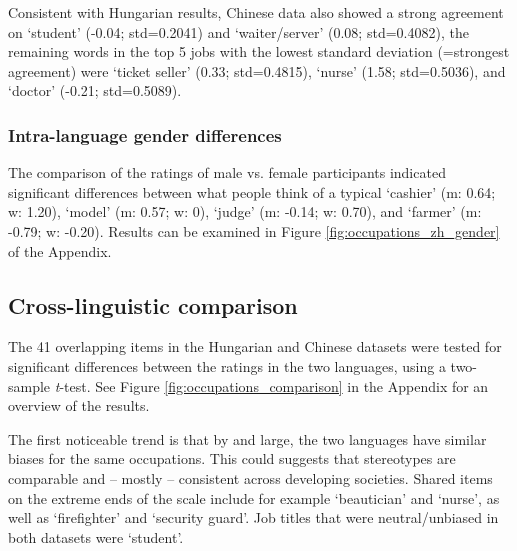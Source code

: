 \documentclass[11pt]{article}
\newcommand{\zh}[1]{\simplifiedchinesefont{#1}\rmfamily}
\begin{document}
Consistent with Hungarian results, Chinese data also showed a strong agreement on \zh{学生} `student' (-0.04; std=0.2041) and \zh{服务员} `waiter/server' (0.08; std=0.4082), the remaining words in the top 5 jobs with the lowest standard deviation (=strongest agreement) were \zh{售票员} `ticket seller' (0.33; std=0.4815), \zh{护士} `nurse' (1.58; std=0.5036), and \zh{医生} `doctor' (-0.21; std=0.5089).



\subsubsection{Intra-language gender differences}

The comparison of the ratings of male vs. female participants indicated significant differences between what people think of a typical \zh{收银员} `cashier' (m: 0.64; w: 1.20), \zh{模特} `model' (m: 0.57; w: 0), \zh{法官} `judge' (m: -0.14; w: 0.70), and \zh{农民} `farmer' (m: -0.79; w: -0.20). Results can be examined in Figure \ref{fig:occupations_zh_gender} of the Appendix.



\subsection{Cross-linguistic comparison}

The 41 overlapping items in the Hungarian and Chinese datasets were tested for significant differences between the ratings in the two languages, using a two-sample \textit{t}-test. See Figure \ref{fig:occupations_comparison} in the Appendix for an overview of the results.

The first noticeable trend is that by and large, the two languages have similar biases for the same occupations. This could suggests that stereotypes are comparable and -- mostly -- consistent across developing societies. Shared items on the extreme ends of the scale include for example `beautician' and `nurse', as well as `firefighter' and `security guard'. Job titles that were neutral/unbiased in both datasets were `student'.
\end{document}
